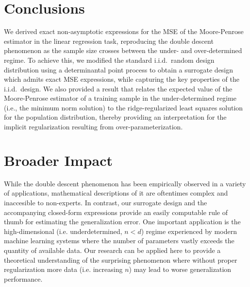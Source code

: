 \documentclass[thesis.tex]{subfiles}
\begin{document}



\section{Conclusions}
\label{s:conclusions}

We derived exact non-asymptotic expressions for the MSE of the
Moore-Penrose estimator in the linear regression task, reproducing
the double descent phenomenon as the sample size crosses between the
under- and over-determined regime. To achieve this, we modified the
standard i.i.d.~random design distribution using a determinantal
point process to obtain a surrogate design which admits exact MSE expressions,
while capturing the key properties of the i.i.d.~design. We
also provided a result that relates the expected value of the
Moore-Penrose estimator of a training sample in the under-determined regime (i.e., the
minimum norm solution) to the ridge-regularized least squares solution
for the population distribution, thereby providing an interpretation for the
implicit regularization resulting from over-parameterization.

\ifisarxiv\else
  \section*{Broader Impact}

  While the double descent phenomenon has been empirically observed in a variety
  of applications, mathematical descriptions of it are oftentimes complex and
  inaccesible to non-experts. In contrast, our surrogate design and the
  accompanying closed-form expressions provide an easily computable rule of thumb
  for estimating the generalization error. One important application is
  the high-dimensional (i.e. underdetermined, $n < d$) regime
  experienced by modern machine learning systems where the number of
  parameters vastly exceeds the quantity of
  available data. Our research can be applied here to provide a theoretical
  understanding of the surprising phenomenon where without proper
  regularization \citep{nakkiran2020optimal} more data (i.e. increasing $n$)
  may lead to worse generalization performance.
\end{document}
